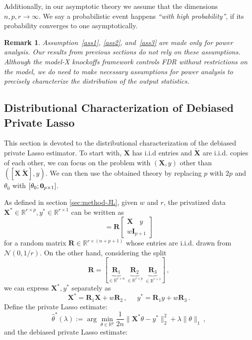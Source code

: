 \documentclass[11pt]{article}
\newtheorem{remark}{Remark}%
\newcommand{\bX}{\boldsymbol{X}}
\newcommand{\bI}{\boldsymbol{I}}
\newcommand{\bXT}{\widetilde{\bX} }
\newcommand{\bR}{\boldsymbol{R}}
\newcommand{\mbR}{\mathbb{R}}
\newcommand{\hth}{\widehat{\theta}}
\begin{document}
Additionally, in our asymptotic theory we assume that the dimensions $n,p,r\to\infty$. We say a probabilistic event happens \emph{``with high probability''}, if its probability converges to one asymptotically. 
\begin{remark}
    Assumption~\ref{ass1}, \ref{ass2}, and~\ref{ass3} are made only for power analysis. Our results from previous sections do not rely on these assumptions. Although the model-X knockoffs framework controls FDR without restrictions on the model, we do need to make necessary assumptions for power analysis to precisely characterize the distribution of the output statistics. 
\end{remark}


\subsection{Distributional Characterization of Debiased Private Lasso}\label{sec:dist-char-lasso}
This section is devoted to the distributional characterization of the debiased private Lasso estimator. To start with, $\bX$ has i.i.d entries and $\bXT$ are i.i.d. copies of each other, we can focus on the problem with $(\bX,y)$ other than $([\bX\ \bXT],y)$. We can then use the obtained theory by replacing $p$ with $2p$ and $\theta_0$ with $[\theta_0;{{\bf{0}}}_{p\times 1}]$. 

As defined in section \ref{sec:method-JL}, given $w$ and $r$, the privatized data $\bX^*\in\mbR^{r\times p},y^*\in\mbR^{r\times 1}$ can be written as
\begin{equation*}
    [\bX^*\ y^*] = \bR\begin{bmatrix}
        \bX\phantom{ss} y\\
        w\bI_{p+1}
    \end{bmatrix}
\end{equation*}
for a random matrix $\bR\in\mbR^{r\times (n+p+1)}$ whose entries are i.i.d. drawn from $\mathcal{N}(0,1/r)$. On the other hand, considering the split 
\begin{equation}\label{eq:R-split}
    \bR = [\underbrace{\bR_1}_{\in\mbR^{r\times n}}\ \underbrace{\bR_2}_{\in\mbR^{r\times p}}\ \underbrace{\bR_3}_{\in\mbR^{r\times 1}}]\,,
\end{equation} 
we can express $\bX^*,y^*$ separately as
\begin{equation}\label{eq:def-private-X-y-alt}
    \bX^* = \bR_1\bX+w\bR_2\,, \phantom{sss} y^* = \bR_1y+w\bR_3\,.
\end{equation}
Define the private Lasso estimate:
\begin{equation}\label{eq:lasso-JL-simpl}
    \hth^*(\lambda) := \arg\min_{\theta\in\mbR^{p}}\frac{1}{2n}\|\bX^*\theta - y^*\|_2^2+\lambda\|\theta\|_1\,,
\end{equation}
and the debiased private Lasso estimate: 
\end{document}
